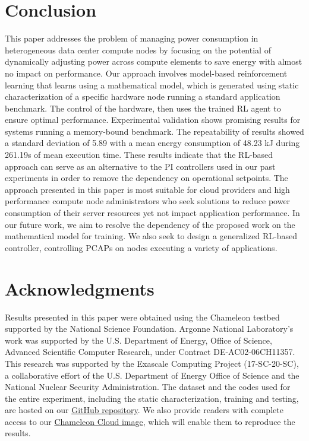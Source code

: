 \section{Conclusion}\label{sec:Conclusion}
This paper addresses the problem of managing power consumption in heterogeneous data center compute nodes by focusing on the potential of dynamically adjusting power across
compute elements to save energy with almost no impact on performance.
Our approach involves model-based reinforcement learning that learns using a mathematical model, which is generated using static characterization of a specific hardware node running a standard application benchmark. The control of the hardware, then uses the trained RL agent to ensure optimal performance. Experimental validation shows promising results for systems running a memory-bound benchmark. The repeatability of results showed a standard deviation of 5.89 with a mean energy consumption of 48.23 \unit{\kilo \joule} during 261.19\unit{\second} of mean execution time. These results indicate that the RL-based approach can serve as an alternative to the PI controllers used in our past experiments in order to remove the dependency on operational setpoints. The approach presented in this paper is most suitable for cloud providers and high performance compute node administrators who seek solutions to reduce power consumption of their server resources yet not impact application performance. In our future work, we aim to resolve the dependency of the proposed work on the mathematical model for training. We also seek to design a generalized RL-based controller, controlling PCAPs on nodes executing a variety of applications.

\section*{Acknowledgments}\label{sec:Acknowledgments}
Results presented in this paper were obtained using the Chameleon testbed supported by the National Science Foundation.
Argonne National Laboratory's work was supported by the U.S. Department of Energy, Office of Science, Advanced Scientific Computer Research, under Contract DE-AC02-06CH11357. This research was supported by the Exascale Computing Project (17-SC-20-SC), a collaborative effort of the U.S. Department of Energy Office of Science and the National Nuclear Security Administration. The dataset and the codes used for the entire experiment, including the static characterization, training and testing, are hosted on our  \href{https://github.com/akhileshraj91/GENERALIZED_RL_ANL.git}{GitHub repository}. 
We also provide readers with complete access to our \href{https://chi.tacc.chameleoncloud.org/ngdetails/OS::Glance::Image/f6974b54-93fc-4140-9163-7aae9fc3070d}{Chameleon Cloud image}, which will enable them to reproduce the results.

